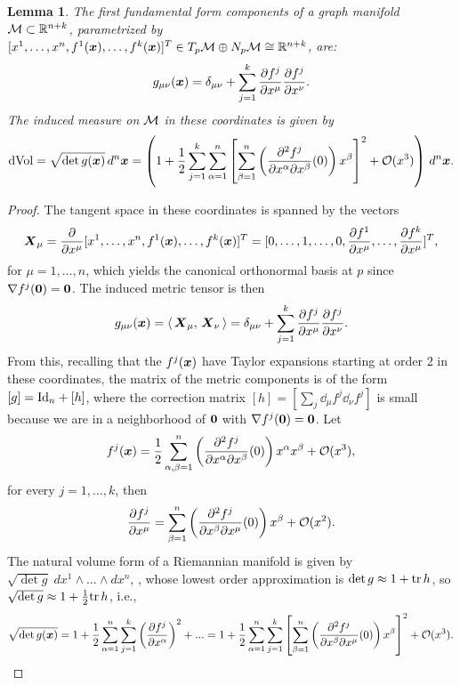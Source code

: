\documentclass[letterpaper, reqno, 11pt]{amsart}
\newtheorem{lemma}[theorem]{Lemma}
\theoremstyle{definition}
\theoremstyle{remark}
\numberwithin{equation}{section}
\begin{document}
\begin{lemma}
	The first fundamental form components of a graph manifold ${\mathcal M}\subset{\mathbb R}^{n+k}$, parametrized by $[x^1,\dots, x^n,f^1(\boldsymbol{x}),\dots,f^k(\boldsymbol{x})]^T\in T_p{\mathcal M}\oplus N_p{\mathcal M}\cong{\mathbb R}^{n+k}$, are:
\begin{equation}
	 g_{\mu\nu}(\boldsymbol{x}) = \delta_{\mu\nu} + \sum_{j=1}^k \frac{\partial f^j}{\partial x^\mu}\frac{\partial f^j}{\partial x^\nu} .
\end{equation}
The induced measure on ${\mathcal M}$ in these coordinates is given by
\begin{equation}
\mathrm{dVol}= \sqrt{\det g(\boldsymbol{x})}\,d^n\boldsymbol{x} = \left(1 + \frac{1}{2}\sum_{j=1}^k\sum^n_{\alpha=1}\left[\sum_{\beta=1}^n\left(\frac{\partial^2 f^j}{\partial x^\alpha\partial x^\beta}(0)\right) x^\beta \right]^2 +{\mathcal O}(x^3)\right)\, d^n\boldsymbol{x}.
\end{equation}
\end{lemma}
\begin{proof}
	The tangent space in these coordinates is spanned by the vectors
	$$
	\boldsymbol{X}_\mu = \frac{\partial}{\partial x^\mu}[x^1,\dots, x^n,f^1(\boldsymbol{x}),\dots,f^k(\boldsymbol{x})]^T = [0,\dots,1,\dots, 0,\frac{\partial f^1}{\partial x^\mu},\dots,\frac{\partial f^k}{\partial x^\mu}]^T,
	$$
	for $\mu=1,\dots, n$, which yields the canonical orthonormal basis at $p$ since $\nabla f^j(\boldsymbol{0})=\boldsymbol{0}$. The induced metric tensor is then
	$$
	g_{\mu\nu}(\boldsymbol{x}) = \langle\, {\boldsymbol{X}_\mu},\,{\boldsymbol{X}_\nu}\,\rangle = \delta_{\mu\nu} + \sum_{j=1}^k \frac{\partial f^j}{\partial x^\mu}\frac{\partial f^j}{\partial x^\nu}.
	$$
	From this, recalling that the $f^j(\boldsymbol{x})$ have Taylor expansions starting at order $2$ in these coordinates, the matrix of the metric components is of the form $[g]=\mathrm{Id}_n + [h]$, where the correction matrix $[h]=[\sum_j\dd_\mu f^j\dd_\nu f^j]$ is small because we are in a neighborhood of $\boldsymbol{0}$ with $\nabla f^j(\boldsymbol{0})=\boldsymbol{0}$. Let
	$$
	f^j(\boldsymbol{x}) = \frac{1}{2}\sum_{\alpha,\beta =1}^n \left(\frac{\partial^2 f^j}{\partial x^\alpha\partial x^\beta}(0)\right) x^\alpha x^\beta + {\mathcal O}(x^3),
	$$
	 for every $j=1,\dots, k$, then
	$$
	\frac{\partial f^j}{\partial x^\mu}  =\sum_{\beta=1}^n\left(\frac{\partial^2 f^j}{\partial x^\beta\partial x^\mu}(0)\right) x^\beta  +{\mathcal O}(x^2).
	$$
The natural volume form of a Riemannian manifold is given by $\sqrt{\det g}\; dx^1\wedge\dots\wedge dx^n$, \cite[Ch. 7, Lem. 19]{oneil1983}, whose lowest order approximation is $\det g\approx 1 + \mathrm{tr}\, h$, so $\sqrt{\det g}\approx 1+\frac{1}{2}\mathrm{tr}\, h$, i.e.,
	$$
	\sqrt{\det g(\boldsymbol{x})} = 1 + \frac{1}{2}\sum_{\alpha=1}^n\sum_{j=1}^k\left(\frac{\partial f^j}{\partial x^\alpha}\right)^2+... = 1 + \frac{1}{2}\sum_{\alpha=1}^n\sum_{j=1}^k\left[ \sum_{\beta=1}^n\left(\frac{\partial^2 f^j}{\partial x^\beta\partial x^\mu}(0)\right) x^\beta  \right]^2 + {\mathcal O}(x^3).
	$$
\end{proof}
\end{document}
